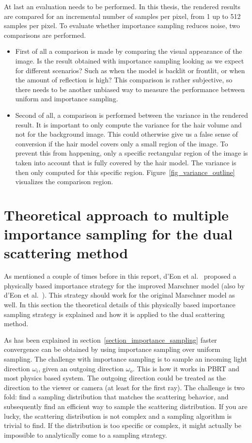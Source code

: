 \documentclass[11pt,a4paper]{report}
\begin{document}
At last an evaluation needs to be performed. In this thesis, the rendered results are compared for an incremental number of samples per pixel, from 1 up to 512 samples per pixel. To evaluate whether importance sampling reduces noise, two comparisons are performed.

\begin{itemize}
    \item First of all a comparison is made by comparing the visual appearance of the image. Is the result obtained with importance sampling looking as we expect for different scenarios? Such as when the model is backlit or frontlit, or when the amount of reflection is high? This comparison is rather subjective, so there needs to be another unbiased way to measure the performance between uniform and importance sampling.
    \item Second of all, a comparison is performed between the variance in the rendered result. It is important to only compute the variance for the hair volume and not for the background image. This could otherwise give us a false sense of conversion if the hair model covers only a small region of the image. To prevent this from happening, only a specific rectangular region of the image is taken into account that is fully covered by the hair model. The variance is then only computed for this specific region. Figure~\ref{fig_variance_outline} visualizes the comparison region.
\end{itemize}


\section{Theoretical approach to multiple importance sampling for the dual scattering method}
\label{approach_problem3}

As mentioned a couple of times before in this report, d'Eon et al.~\cite{eon2013} proposed a physically based importance strategy for the improved Marschner model (also by d'Eon et al.~\cite{eon2011}). This strategy should work for the original Marschner model as well. In this section the theoretical details of this physically based importance sampling strategy is explained and how it is applied to the dual scattering method. 

As has been explained in section~\ref{section_importance_sampling} faster convergence can be obtained by using importance sampling over uniform sampling. The challenge with importance sampling is to sample an incoming light direction $\omega_i$, given an outgoing direction $\omega_o$. This is how it works in PBRT and most physics based system. The outgoing direction could be treated as the direction to the viewer or camera (at least for the first ray). The challenge is two fold: find a sampling distribution that matches the scattering behavior, and subsequently find an efficient way to sample the scattering distribution. If you are lucky, the scattering distribution is not complex and a sampling algorithm is trivial to find. If the distribution is too specific or complex, it might actually be impossible to analytically come to a sampling strategy.
\end{document}
